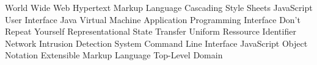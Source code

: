 \begin{acronym}[HTML]
			{World Wide Web}
			{Hypertext Markup Language}
			{Cascading Style Sheets}
			{JavaScript}
			{User Interface}
			{Java Virtual Machine}
   			{Application Programming Interface}
	      {Don't Repeat Yourself}
	     {Representational State Transfer}
	      {Uniform Ressource Identifier}
	     {Network Intrusion Detection System}
	      {Command Line Interface}
	     {JavaScript Object Notation}
	      {Extensible Markup Language}
				{Top-Level Domain}
\end{acronym}
